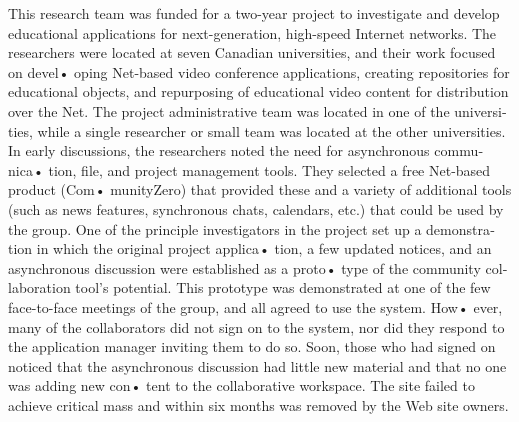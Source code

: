 \documentclass[a4paper,12pt]{article}
\begin{document}
\begin{latin}
\vspace{0.1cm}
\vspace{0.1cm}
\vspace{0.1cm}
\indent
This research  team was funded  for a  two-year  project  to investigate  and develop educational  applications for next-generation, high-speed  Internet networks. The researchers were located at seven Canadian universities, and their work focused on devel• oping  Net-based video  conference  applications,  creating  repositories  for  educational objects, and repurposing of educational video content  for distribution over the Net. The project administrative team was located in one of the universities, while a single  researcher or small team was located  at the other universities.\\
\vspace{0.1cm}
\vspace{0.1cm}
In early discussions, the researchers noted the need for asynchronous communica•
tion,  file, and project management  tools. They selected a free Net-based  product  (Com• munityZero)  that provided these and a variety of additional  tools (such as news features, synchronous chats, calendars, etc.) that could be used by the group. One of the principle investigators in the project set up a demonstration in which the original project applica• tion,  a few updated  notices, and an asynchronous  discussion were established as a proto• type of the community  collaboration  tool's potential. This prototype was demonstrated  at one of the few face-to-face meetings of the group, and all agreed to use the system. How• ever, many of the collaborators did not sign on to the system, nor did they respond to the application manager inviting them to do so.  Soon, those who had signed on noticed that the asynchronous  discussion had little new material and that no one was adding new con• tent to the collaborative workspace. The site failed to achieve critical mass and within six months was removed by the Web site owners.



\end{latin}
\end{document}
